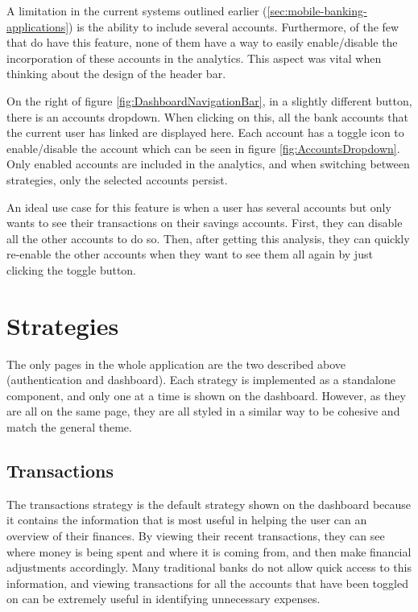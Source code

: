 A limitation in the current systems outlined earlier (\ref{sec:mobile-banking-applications}) is the ability to include several accounts. Furthermore, of the few that do have this feature, none of them have a way to easily enable/disable the incorporation of these accounts in the analytics. This aspect was vital when thinking about the design of the header bar.

On the right of figure \ref{fig:DashboardNavigationBar}, in a slightly different button, there is an accounts dropdown. When clicking on this, all the bank accounts that the current user has linked are displayed here. Each account has a toggle icon to enable/disable the account which can be seen in figure \ref{fig:AccountsDropdown}. Only enabled accounts are included in the analytics, and when switching between strategies, only the selected accounts persist.

An ideal use case for this feature is when a user has several accounts but only wants to see their transactions on their savings accounts. First, they can disable all the other accounts to do so. Then, after getting this analysis, they can quickly re-enable the other accounts when they want to see them all again by just clicking the toggle button.

\section{Strategies}
The only pages in the whole application are the two described above (authentication and dashboard). Each strategy is implemented as a standalone component, and only one at a time is shown on the dashboard. However, as they are all on the same page, they are all styled in a similar way to be cohesive and match the general theme.

\subsection{Transactions}
The transactions strategy is the default strategy shown on the dashboard because it contains the information that is most useful in helping the user can an overview of their finances. By viewing their recent transactions, they can see where money is being spent and where it is coming from, and then make financial adjustments accordingly. Many traditional banks do not allow quick access to this information, and viewing transactions for all the accounts that have been toggled on can be extremely useful in identifying unnecessary expenses.

